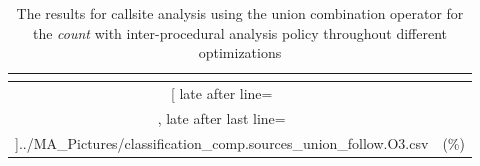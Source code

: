 \begin{table}[!htbp]
{\begin{tabular}{|c|c}
\multicolumn{1}{c}{}
	\\\midrule
	\csvreader[ late after line=\\, late after last line=\\\bottomrule]{../MA_Pictures/classification_comp.sources_union_follow.O3.csv}{
}
	{\csvcoliv (\csvcolv \%) & \csvcolvi (\csvcolvii\%)}%


    	\end{tabular}
}
		\caption {The results for callsite analysis using the union combination operator for the \textit{count} with inter-procedural analysis policy throughout different optimizations}
		\label{tbl:CSunionCOUNTinter}
\end{table}

